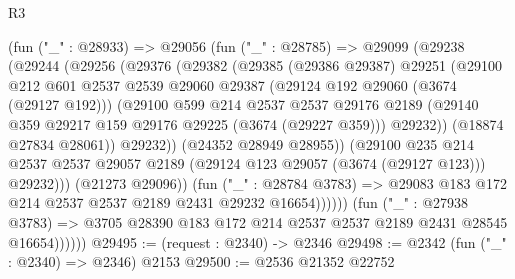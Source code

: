 \begin{lexlean}{R3}
\begin{coremodule}
                      (fun ("_" : @28933) =>
                      @29056
                        (fun ("_" : @28785) =>
                        @29099
                          (@29238
                            (@29244
                              (@29256
                                (@29376
                                  (@29382
                                    (@29385
                                      (@29386 @29387)
                                      @29251
                                      (@29100
                                        @212
                                        @601
                                        @2537
                                        @2539
                                        @29060
                                        @29387
                                        (@29124 @192 @29060 (@3674 (@29127 @192)))
                                        (@29100
                                          @599
                                          @214
                                          @2537
                                          @2537
                                          @29176
                                          @2189
                                          (@29140
                                            @359
                                            @29217
                                            @159
                                            @29176
                                            @29225
                                            (@3674 (@29227 @359)))
                                          @29232))
                                      (@18874 @27834 @28061))
                                    @29232))
                                (@24352 @28949 @28955))
                              (@29100
                                @235
                                @214
                                @2537
                                @2537
                                @29057
                                @2189
                                (@29124 @123 @29057 (@3674 (@29127 @123)))
                                @29232)))
                          (@21273 @29096))
                        (fun ("_" : @28784 @3783) =>
                        @29083 @183 @172 @214 @2537 @2537 @2189 @2431 @29232 @16654))))))
              (fun ("_" : @27938 @3783) =>
              @3705 @28390 @183 @172 @214 @2537 @2537 @2189 @2431 @28545 @16654))))))
@29495 := (request : @2340) -> @2346
@29498 := @2342 (fun ("_" : @2340) => @2346) @2153
@29500 := @2536 @21352 @22752

\end{coremodule}
\end{lexlean}
